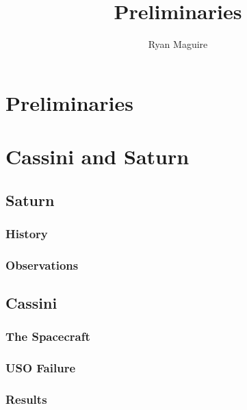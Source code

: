 \documentclass[crop=false,class=book,oneside]{standalone}
\begin{document}
    \ifx\ifplanetdiff\undefined
        \title{Preliminaries}
        \author{Ryan Maguire}
        \date{\vspace{-5ex}}
        \maketitle
        \tableofcontents
        \clearpage
        \chapter{Preliminaries}
    \else
        \chapter{Cassini and Saturn}
    \fi
    \section{Saturn}
        \subsection{History}
        \subsection{Observations}
    \section{Cassini}
        \subsection{The Spacecraft}
        \subsection{USO Failure}
        \subsection{Results}
\end{document}
